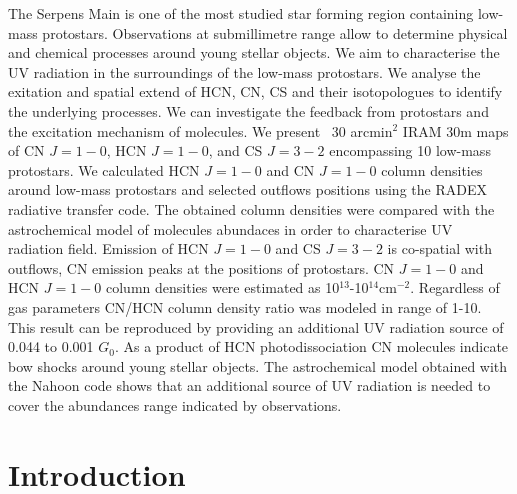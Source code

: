 \documentclass{aa}
\begin{document}
  \abstract
   {The Serpens Main is one of the most studied star forming region containing low-mass protostars. Observations at submillimetre range allow to determine physical and chemical processes around young stellar objects.} %
   {We aim to characterise the UV radiation in the surroundings of the low-mass protostars. We analyse the exitation and spatial extend of HCN, CN, CS and their isotopologues to identify the underlying processes. We can investigate the feedback from protostars and the excitation mechanism of molecules. }
   {We present ~30 arcmin$^2$ IRAM 30m maps of CN $J=1-0$, HCN $J=1-0$, and CS $J=3-2$ encompassing 10 low-mass protostars. We calculated HCN $J=1-0$ and CN $J=1-0$ column densities around low-mass protostars and selected outflows positions using the RADEX radiative transfer code.  The obtained column densities were compared with the astrochemical model of molecules abundaces in order to characterise UV radiation field.}
   {Emission of HCN $J=1-0$ and CS $J=3-2$ is co-spatial with outflows, CN emission peaks at the positions of protostars. CN $J=1-0$ and HCN $J=1-0$ column densities were estimated as 10$^{13}$-10$^{14}$cm$^{-2}$. Regardless of gas parameters CN/HCN column density ratio was modeled in range of 1-10. This result can be reproduced by providing an additional UV radiation source of 0.044 to 0.001 $G_0$.}
   {As a product of HCN photodissociation CN molecules indicate bow shocks around young stellar objects. The astrochemical model obtained with the Nahoon code shows that an additional source of UV radiation is needed to cover the abundances range indicated by observations.}


   \maketitle
%

\section{Introduction}
\end{document}
